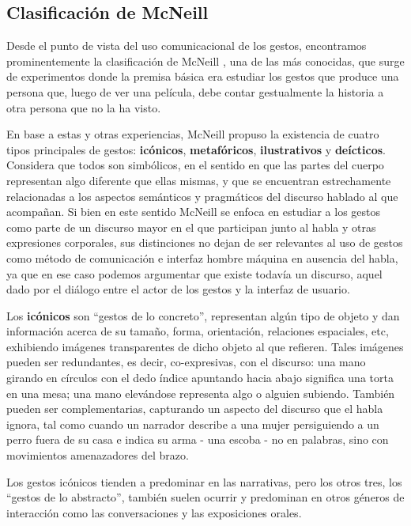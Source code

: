 

\subsection{Clasificación de McNeill}

Desde el punto de vista del uso comunicacional de los gestos, encontramos prominentemente la clasificación de McNeill \cite{mcneill92,Studdert1993}, una de las más conocidas, que surge de experimentos donde la premisa básica era estudiar los gestos que produce una persona que, luego de ver una película, debe contar gestualmente la historia a otra persona que no la ha visto. 

En base a estas y otras experiencias, McNeill propuso la existencia de cuatro tipos principales de gestos: \textbf{icónicos}, \textbf{metafóricos}, \textbf{ilustrativos} y \textbf{deícticos}. Considera que todos son simbólicos, en el sentido en que las partes del cuerpo representan algo diferente que ellas mismas, y que se encuentran estrechamente relacionadas a los aspectos semánticos y pragmáticos del discurso hablado al que acompañan. Si bien en este sentido McNeill se enfoca en estudiar a los gestos como parte de un discurso mayor en el que participan junto al habla y otras expresiones corporales, sus distinciones no dejan de ser relevantes al uso de gestos como método de comunicación e interfaz hombre máquina en ausencia del habla, ya que en ese caso podemos argumentar que existe todavía un discurso, aquel dado por el diálogo entre el actor de los gestos y la interfaz de usuario.

Los \textbf{icónicos} son ``gestos de lo concreto'', representan algún tipo de objeto y dan información acerca de su tamaño, forma, orientación, relaciones espaciales, etc, exhibiendo imágenes transparentes de dicho objeto al que refieren.
Tales imágenes pueden ser redundantes, es decir, co-expresivas, con el discurso: una mano girando en círculos con el dedo índice apuntando hacia abajo significa una torta en una mesa; una mano elevándose representa algo o alguien subiendo. También pueden ser complementarias, capturando un aspecto del discurso que el habla ignora, tal como cuando un narrador describe a una mujer persiguiendo a un perro fuera de su casa e indica su arma - una escoba - no en palabras, sino con movimientos amenazadores del brazo.

Los gestos icónicos tienden a predominar en las narrativas, pero los otros tres, los ``gestos de lo abstracto'', también suelen ocurrir y predominan en otros géneros de interacción como las conversaciones y las exposiciones orales. 

